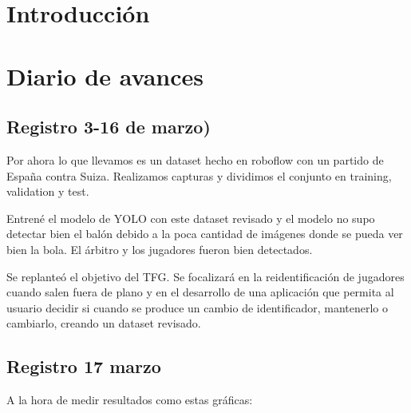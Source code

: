 \documentclass[12pt, a4paper, twoside]{article}
\begin{document}
	
	
	
	\clearpage
	\setcounter{page}{1}
	
	
	
	\tableofcontents
	\newpage
	
	
	\section{Introducción}
	
	\section{Diario de avances}
	
	\subsection{Registro 3-16 de marzo)}
	
	Por ahora lo que llevamos es un dataset hecho en roboflow con un partido de España contra Suiza. Realizamos capturas y dividimos el conjunto en training, validation y test.
	
	Entrené el modelo de YOLO con este dataset revisado y el modelo no supo detectar bien el balón debido a la poca cantidad de imágenes donde se pueda ver bien la bola. El árbitro y los jugadores fueron bien detectados.
	
	Se replanteó el objetivo del TFG. Se focalizará en la reidentificación de jugadores cuando salen fuera de plano y en el desarrollo de una aplicación que permita al usuario decidir si cuando se produce un cambio de identificador, mantenerlo o cambiarlo, creando un dataset revisado.
	
	\subsection{Registro 17 marzo}
	
	A la hora de medir resultados como estas gráficas:
	
\end{document}
